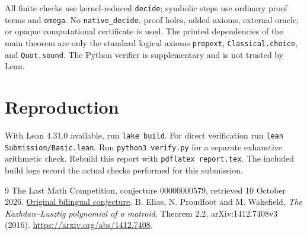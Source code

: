 \documentclass[11pt]{article}
\begin{document}
All finite checks use kernel-reduced \texttt{decide}; symbolic steps use ordinary proof terms and \texttt{omega}. No \texttt{native\_decide}, proof holes, added axioms, external oracle, or opaque computational certificate is used. The printed dependencies of the main theorem are only the standard logical axioms \texttt{propext}, \texttt{Classical.choice}, and \texttt{Quot.sound}. The Python verifier is supplementary and is not trusted by Lean.

\section{Reproduction}
With Lean 4.31.0 available, run \texttt{lake build}. For direct verification run \texttt{lean Submission/Basic.lean}. Run \texttt{python3 verify.py} for a separate exhaustive arithmetic check. Rebuild this report with \texttt{pdflatex report.tex}. The included build logs record the actual checks performed for this submission.

\begin{thebibliography}{9}
 The Last Math Competition, conjecture 00000000579, retrieved 10 October 2026. \href{https://github.com/The-Last-Math-Competition/The-Last-Math-Competition/blob/main/conjectures/00000000579.md}{Original bilingual conjecture}.
 B. Elias, N. Proudfoot and M. Wakefield, \emph{The Kazhdan--Lusztig polynomial of a matroid}, Theorem 2.2, arXiv:1412.7408v3 (2016). \url{https://arxiv.org/abs/1412.7408}.
\end{thebibliography}
\end{document}
